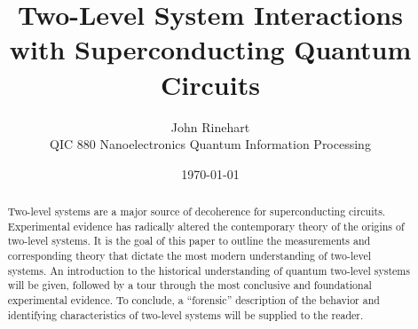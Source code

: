 \documentclass[aps,prl,reprint,groupedaddress]{revtex4-1}
\begin{document}

\title{Two-Level System Interactions with Superconducting Quantum Circuits}


\author{John Rinehart\\
\normalsize QIC 880 Nanoelectronics Quantum Information Processing}


\date{\today}

\begin{abstract}
Two-level systems are a major source of decoherence for superconducting circuits. Experimental evidence has radically altered the contemporary theory of the origins of two-level systems. It is the goal of this paper to outline the measurements and corresponding theory that dictate the most modern understanding of two-level systems. An introduction to the historical understanding of quantum two-level systems will be given, followed by a tour through the most conclusive and foundational experimental evidence. To conclude, a ``forensic'' description of the behavior and identifying characteristics of two-level systems will be supplied to the reader.
\end{abstract}

\pacs{}
\end{document}
